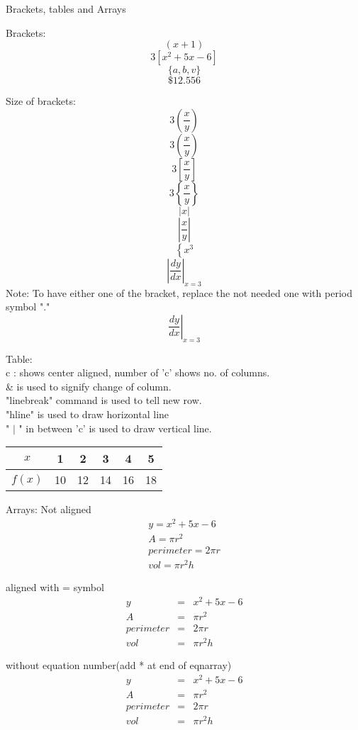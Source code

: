 \documentclass[10pt]{article}
\begin{document}
Brackets, tables and Arrays

Brackets: \\
$$ (x+1) $$
$$ 3[x^2+5x-6] $$ 
$$ \{a,b,v\}$$
$$ \$12.556$$

Size of brackets: \\
$$ 3(\frac{x}{y}) $$
$$ 3\left(\frac{x}{y}\right)$$
$$ 3\left[\frac{x}{y}\right]$$
$$ 3\left\{\frac{x}{y}\right\}$$
$$ |x|$$
$$ \left|\frac{x}{y}\right|$$
$$ \left\{x^3\right.$$
$$ \left|\frac{dy}{dx}\right|_{x=3}$$
Note: To have either one of the bracket, replace the not needed one with period symbol "."
$$ \left.\frac{dy}{dx}\right|_{x=3}$$

Table:\\
c : shows center aligned, number of 'c' shows no. of columns.\\
\& is used to signify change of column.\\
"linebreak" command is used to tell new row.\\
"hline" is used to draw horizontal line\\ 
" $|$ " in between 'c' is used to draw vertical line.\\

\begin{tabular}{|c|ccccc|}
\hline
$x$ & 1 & 2 & 3 & 4 & 5\\ \hline
$f(x)$ & 10 & 12 & 14 & 16 & 18\\ \hline
\end{tabular}

Arrays: 
 Not aligned 
\begin{eqnarray}
y = x^2+5x-6 \\
A = \pi r^2\\
perimeter = 2 \pi r\\
vol = \pi r^2 h
\end{eqnarray}

aligned with = symbol
\begin{eqnarray}
y &=& x^2+5x-6 \\
A &=& \pi r^2\\
perimeter &= &2 \pi r\\
vol &= &\pi r^2 h
\end{eqnarray}

without equation number(add * at end of eqnarray)
\begin{eqnarray*}
y &=& x^2+5x-6 \\
A &=& \pi r^2\\
perimeter &= &2 \pi r\\
vol &= &\pi r^2 h
\end{eqnarray*}
\end{document}
